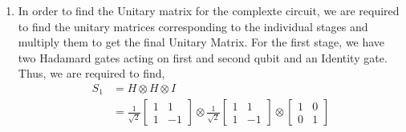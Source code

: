 \begin{example}
\begin{enumerate}
        The output after this stage will be:
        \begin{align*}
            (RX \otimes CX)(\frac{1}{2}(\ket{000}-\ket{010}+\ket{100}-\ket{110}))&=\frac{1}{2}(RX\ket{0} \otimes CX\ket{00}-RX\ket{0} \otimes CX\ket{10}\\
            &+RX\ket{1}\otimes CX\ket{00}-RX\ket{1}\otimes CX\ket{10})\\
            &=\frac{\ket{100}-\ket{111}-\ket{000}+\ket{011}}{2}
        \end{align*}
        Here the action of RXx is $RX\ket{0}=\ket{1}$, $RX\ket{1}=-\ket{0}$.
        Now we apply the last stage which involves applying X gate on the first qubit and Z gate on the 3rd qubits.
        \begin{align*} 
            (X \otimes I \otimes Z)\frac{\ket{100}-\ket{111}-\ket{000}+\ket{011}}{2}&=\frac{1}{2}(X\ket{1} \otimes I\ket{0} \otimes Z\ket{0}-X\ket{1}\otimes \\
            & I\ket{1}\otimes Z\ket{1}-X\ket{0}\otimes I\ket{0}\otimes Z\ket{0}+X\ket{0}\otimes I\ket{1}\\
            &\otimes Z\ket{1})\\
            &=\frac{1}{2}(\ket{000}+\ket{011}-\ket{100}-\ket{111})
        \end{align*}
        Thus, the state of the qubits after passing through the circuit.
        In the matrix form, it can be written as:
        \[
            \frac{1}{2}\begin{bmatrix} 1 \\ 0 \\ 0 \\ 1 \\ -1 \\ 0 \\ 0 \\-1 \end{bmatrix}
        \]
        \item In order to find the Unitary matrix for the complexte circuit, we are required to find the unitary matrices corresponding to 
        the individual stages and multiply them to get the final Unitary Matrix.
        For the first stage, we have two Hadamard gates acting on first and second qubit and an Identity gate. Thus, we are required to find,
        \begin{align*}
            S_1 &= H \otimes H \otimes I\\
            &= \frac{1}{\sqrt{2}}\begin{bmatrix} 1 & 1 \\ 1 & -1 \end{bmatrix} \otimes \frac{1}{\sqrt{2}}\begin{bmatrix} 1 & 1 \\ 1 & -1 \end{bmatrix} \otimes \begin{bmatrix} 1 & 0 \\ 0 & 1 \end{bmatrix}\\

\end{align*}
\end{enumerate}
\end{example}
